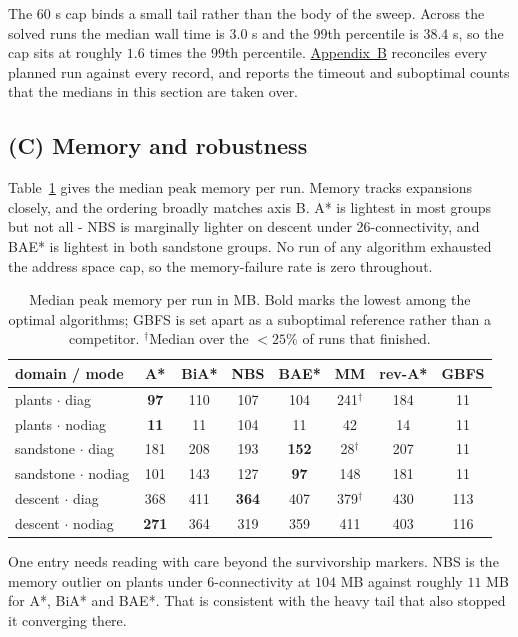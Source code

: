 \documentclass[letterpaper]{article} %
\begin{document}
The 60 s cap binds a small tail rather than the body of the sweep. Across the solved runs the median wall time is $3.0$ s and the 99th percentile is $38.4$ s, so the cap sits at roughly $1.6$ times the 99th percentile. \hyperref[app:b]{Appendix~B} reconciles every planned run against every record, and reports the timeout and suboptimal counts that the medians in this section are taken over.

\subsection{(C) Memory and robustness}
Table~\ref{tab:mem} gives the median peak memory per run. Memory tracks expansions closely, and the ordering broadly matches axis B. A* is lightest in most groups but not all - NBS is marginally lighter on descent under 26-connectivity, and BAE* is lightest in both sandstone groups. No run of any algorithm exhausted the address space cap, so the memory-failure rate is zero throughout.

\begin{table}[t] \centering\small \setlength{\tabcolsep}{2pt}
  \begin{tabular}{lcccccc@{\hspace{6pt}}c} \toprule domain / mode & A* & BiA* & NBS & BAE* & MM & rev-A* & GBFS \\ \midrule plants $\cdot$ diag & \textbf{97} & 110 & 107 & 104 & 241$^\dagger$ & 184 & 11 \\ plants $\cdot$ nodiag & \textbf{11} & 11 & 104 & 11 & 42 & 14 & 11 \\ \addlinespace[2pt] sandstone $\cdot$ diag & 181 & 208 & 193 & \textbf{152} & 28$^\dagger$ & 207 & 11 \\ sandstone $\cdot$ nodiag & 101 & 143 & 127 & \textbf{97} & 148 & 181 & 11 \\ \addlinespace[2pt] descent $\cdot$ diag & 368 & 411 & \textbf{364} & 407 & 379$^\dagger$ & 430 & 113 \\ descent $\cdot$ nodiag & \textbf{271} & 364 & 319 & 359 & 411 & 403 & 116 \\ \bottomrule
  \end{tabular}
  \caption{Median peak memory per run in MB. Bold marks the lowest among the optimal algorithms; GBFS is set apart as a suboptimal reference rather than a competitor. $^\dagger$Median over the $<25\%$ of runs that finished.}\label{tab:mem}
\end{table}

One entry needs reading with care beyond the survivorship markers. NBS is the memory outlier on plants under 6-connectivity at $104$ MB against roughly $11$ MB for A*, BiA* and BAE*. That is consistent with the heavy tail that also stopped it converging there.
\end{document}
